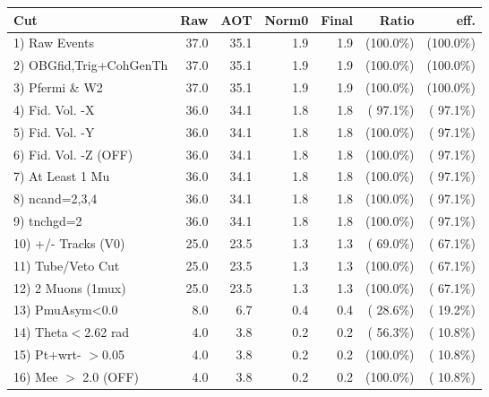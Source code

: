  \begin{table}[h!]\centering
 \begin{tabular}{||l||r|r|r|r|r|r||}
 \hline
 \hline
 Cut & Raw & AOT & Norm0 & Final & Ratio & eff.       \\
 \hline
  1) Raw Events           &         37.0 &         35.1 &          1.9 &          1.9 & (100.0\%) & (100.0\%) \\
  2) OBGfid,Trig+CohGenTh &         37.0 &         35.1 &          1.9 &          1.9 & (100.0\%) & (100.0\%) \\
  3) Pfermi \& W2         &         37.0 &         35.1 &          1.9 &          1.9 & (100.0\%) & (100.0\%) \\
  4) Fid. Vol. -X         &         36.0 &         34.1 &          1.8 &          1.8 & ( 97.1\%) & ( 97.1\%) \\
  5) Fid. Vol. -Y         &         36.0 &         34.1 &          1.8 &          1.8 & (100.0\%) & ( 97.1\%) \\
  6) Fid. Vol. -Z (OFF)   &         36.0 &         34.1 &          1.8 &          1.8 & (100.0\%) & ( 97.1\%) \\
  7) At Least 1 Mu        &         36.0 &         34.1 &          1.8 &          1.8 & (100.0\%) & ( 97.1\%) \\
  8) ncand=2,3,4          &         36.0 &         34.1 &          1.8 &          1.8 & (100.0\%) & ( 97.1\%) \\
  9) tnchgd=2             &         36.0 &         34.1 &          1.8 &          1.8 & (100.0\%) & ( 97.1\%) \\
 10) +/- Tracks (V0)      &         25.0 &         23.5 &          1.3 &          1.3 & ( 69.0\%) & ( 67.1\%) \\
 11) Tube/Veto Cut        &         25.0 &         23.5 &          1.3 &          1.3 & (100.0\%) & ( 67.1\%) \\
 12) 2 Muons (1mux)       &         25.0 &         23.5 &          1.3 &          1.3 & (100.0\%) & ( 67.1\%) \\
 13) PmuAsym<0.0          &          8.0 &          6.7 &          0.4 &          0.4 & ( 28.6\%) & ( 19.2\%) \\
 14) Theta$<$2.62 rad     &          4.0 &          3.8 &          0.2 &          0.2 & ( 56.3\%) & ( 10.8\%) \\
 15) Pt+wrt- $>$0.05      &          4.0 &          3.8 &          0.2 &          0.2 & (100.0\%) & ( 10.8\%) \\
 16) Mee $>$ 2.0  (OFF)   &          4.0 &          3.8 &          0.2 &          0.2 & (100.0\%) & ( 10.8\%) \\

\end{tabular}
\end{table}
